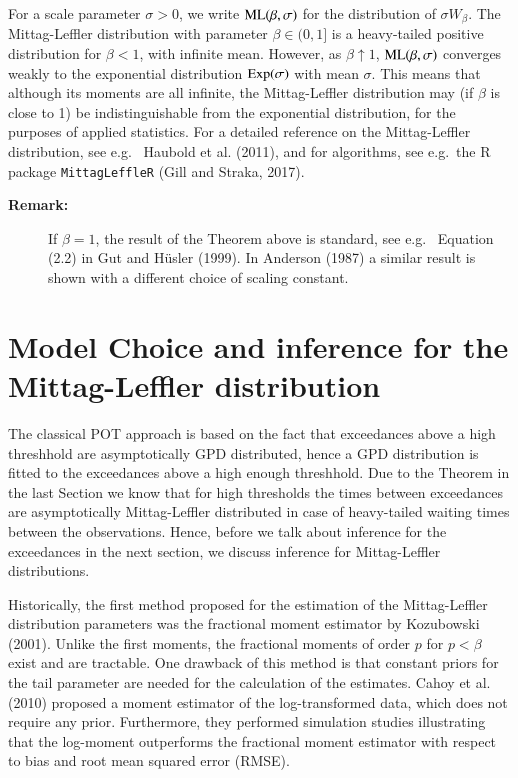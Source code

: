 \documentclass[]{elsarticle} %
\begin{document}
For a scale parameter \(\sigma > 0\), we write
\({\rm ML}(\beta, \sigma)\) for the distribution of \(\sigma W_\beta\).
The Mittag-Leffler distribution with parameter \(\beta \in (0,1]\) is a
heavy-tailed positive distribution for \(\beta < 1\), with infinite
mean. However, as \(\beta \uparrow 1\), \({\rm ML}(\beta, \sigma)\)
converges weakly to the exponential distribution \({\rm Exp}(\sigma)\)
with mean \(\sigma\). This means that although its moments are all
infinite, the Mittag-Leffler distribution may (if \(\beta\) is close to
1) be indistinguishable from the exponential distribution, for the
purposes of applied statistics. For a detailed reference on the
Mittag-Leffler distribution, see e.g.~ Haubold et al. (2011), and for
algorithms, see e.g.~the R package \texttt{MittagLeffleR} (Gill and
Straka, 2017).

\begin{description}
\item[\textbf{Remark:}]
If \(\beta = 1\), the result of the Theorem above is standard, see e.g.~
Equation (2.2) in Gut and Hüsler (1999). In Anderson (1987) a similar
result is shown with a different choice of scaling constant.
\end{description}

\hypertarget{sec:ML}{%
\section{Model Choice and inference for the Mittag-Leffler
distribution}\label{sec:ML}}

The classical POT approach is based on the fact that exceedances above a
high threshhold are asymptotically GPD distributed, hence a GPD
distribution is fitted to the exceedances above a high enough
threshhold. Due to the Theorem in the last Section we know that for high
thresholds the times between exceedances are asymptotically
Mittag-Leffler distributed in case of heavy-tailed waiting times between
the observations. Hence, before we talk about inference for the
exceedances in the next section, we discuss inference for Mittag-Leffler
distributions.

Historically, the first method proposed for the estimation of the
Mittag-Leffler distribution parameters was the fractional moment
estimator by Kozubowski (2001). Unlike the first moments, the fractional
moments of order \(p\) for \(p<\beta\) exist and are tractable. One
drawback of this method is that constant priors for the tail parameter
are needed for the calculation of the estimates. Cahoy et al. (2010)
proposed a moment estimator of the log-transformed data, which does not
require any prior. Furthermore, they performed simulation studies
illustrating that the log-moment outperforms the fractional moment
estimator with respect to bias and root mean squared error (RMSE).
\end{document}
